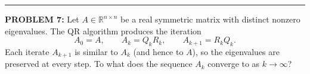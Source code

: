 \documentclass[12pt]{amsart}
\newcommand{\divider}{
  \vspace{-1em} %
  \noindent
  \raisebox{-0.15ex}{\textbullet}%
  \hspace{0.5em}%
  \rule[0.5ex]{0.95\textwidth}{1.0pt}%
  \hspace{0.5em}%
  \raisebox{-0.15ex}{\textbullet}%
  \vspace{0em} %
}
\begin{document}
%
%
\divider 

{\bf PROBLEM 7:}
%
Let $A \in \mathbb{R}^{n \times n}$ be a real symmetric matrix with distinct
nonzero eigenvalues. The QR algorithm produces the iteration
$$A_0 = A, \qquad A_k = Q_k R_k, \qquad A_{k+1} = R_k Q_k.$$
Each iterate $A_{k+1}$ is similar to $A_k$ (and hence to $A$), so the eigenvalues
are preserved at every step. To what does the sequence $A_k$ converge to as $k \to \infty$?
\end{document}
